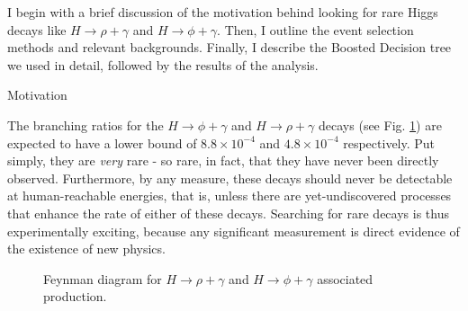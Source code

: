 %
%

I begin with a brief discussion of the motivation behind looking for rare Higgs decays like $H \rightarrow \rho+\gamma$ and $H \rightarrow \phi+\gamma$. Then, I outline the event selection methods and relevant backgrounds. Finally, I describe the Boosted Decision tree we used in detail, followed by the results of the analysis.

\begin{section}{Motivation}

The branching ratios for the $H \rightarrow \phi+\gamma$ and $H \rightarrow \rho+\gamma$ decays (see Fig. \ref{fig:whiggs}) are expected to have a lower bound of $8.8 \times 10^{-4}$ and $4.8 \times 10^{-4}$  respectively\cite{cite-rpg-brs}. Put simply, they are \textit{very} rare - so rare, in fact, that they have never been directly observed. Furthermore, by any measure, these decays should never be detectable at human-reachable energies, that is, unless there are yet-undiscovered processes that enhance the rate of either of these decays. Searching for rare decays is thus experimentally exciting, because any significant measurement is direct evidence of the existence of new physics.

\begin{figure}[htb]
\begin{center}

\end{center}
\caption{Feynman diagram\cite{cite-tikz-feynman} for $H \rightarrow \rho+\gamma$ and $H \rightarrow \phi+\gamma$ associated production.}
\label{fig:whiggs}
\end{figure}
\end{section}

